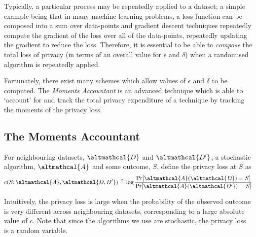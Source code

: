 Typically, a particular process may be repeatedly applied to a dataset; a simple example being that in many machine learning problems, a loss function can be composed into a sum over data-points and gradient descent techniques repeatedly compute the gradient of the loss over all of the data-points, repeatedly updating the gradient to reduce the loss. \cite{ruder2016overview} Therefore, it is essential to be able to \emph{compose} the total loss of privacy (in terms of an overall value for $\epsilon$ and $\delta$) when a randomised algorithm is repeatedly applied. 

Fortunately, there exist many schemes which allow values of $\epsilon$ and $\delta$ to be computed. The \emph{Moments Accountant} is an advanced technique which is able to `account' for and track the total privacy expenditure of a technique by tracking the moments of the privacy loss. 

\subsection{The Moments Accountant}
\begin{definition} For neighbouring datasets, $\altmathcal{D}$ and $\altmathcal{D'}$, a stochastic algorithm, $\altmathcal{A}$ and some outcome, $S$, define the privacy loss at $S$ as
	\begin{equation}
	c(S; \altmathcal{A}, \altmathcal{D, D'}) \triangleq \log \frac{\Pr[ \altmathcal{A}( \altmathcal{D})=S]}{\Pr[ \altmathcal{A}(\altmathcal{D'}) = S]}
	\end{equation}
\end{definition}
Intuitively, the privacy loss is large when the probability of the observed outcome is very different across neighbouring datasets, corresponding to a large absolute value of $c$. Note that since the algorithms we use are stochastic, the privacy loss is a random variable. \cite{moments_account}


